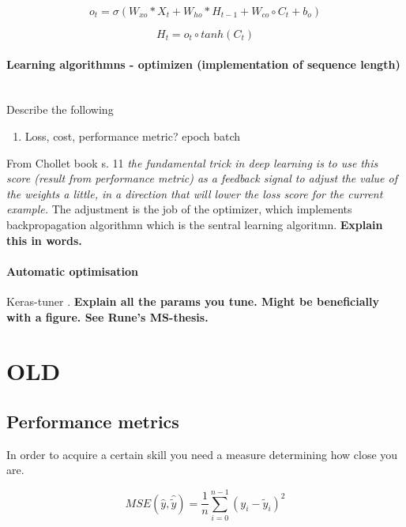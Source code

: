 \begin{equation} \label{eq:CLSTM4_output_gate}
        o_t = \sigma \left( W_{xo}*X_t + W_{ho}*H_{t-1} + W_{co}\circ C_{t}+b_o \right)
\end{equation}

\begin{equation} \label{eq:CLSTM5_hidden_state}
        H_t = o_t \circ tanh \left( C_t \right)
\end{equation}

\paragraph{Learning algorithmns - optimizen (implementation of sequence length)} \mbox{}\\
Describe the following
\begin{enumerate}
    \item Loss, cost, performance metric? epoch batch
\end{enumerate}

From Chollet book s. 11 \textit{the fundamental trick in deep learning is to use this score (result from performance metric) as a feedback signal to adjust the value of the weights a little, in a direction that will lower the loss score for the current example. } The adjustment is the job of the optimizer, which implements backpropagation algorithmn which is the sentral learning algoritmn.
\textbf{Explain this in words.}



\paragraph{Automatic optimisation}
Keras-tuner .
\textbf{Explain all the params you tune. Might be beneficially with a figure. See Rune's MS-thesis.}




\section{OLD }

\subsection{Performance metrics}  \label{sec:perf_metrics}
In order to acquire a certain skill you need a measure determining how close you are. 

\begin{equation} \label{eq:mse}
    MSE(\hat{y},\hat{\tilde{y}}) = \frac{1}{n} \sum_{i=0}^{n-1}(y_i-\tilde{y}_i)^2
\end{equation} 

